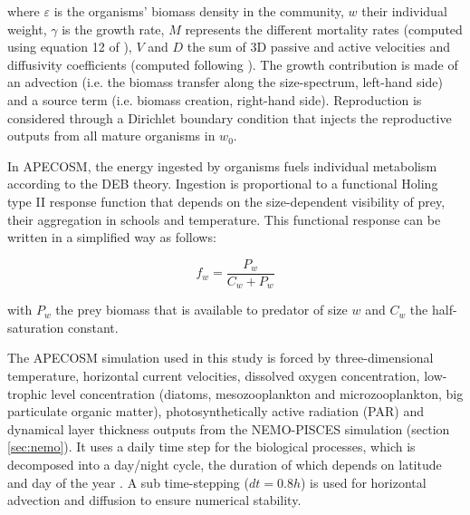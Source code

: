 where $\varepsilon$  is the organisms' biomass density in the community, $w$ their individual weight, $\gamma$ is the growth rate, $M$ represents the different mortality rates (computed using equation 12 of \citealt{mauryIndividualsPopulationsCommunities2013}), $V$ and $D$ the sum of 3D passive and active velocities and diffusivity coefficients (computed following \citealt{faugerasAdvectiondiffusionreactionSizestructuredFish2005}). The growth contribution is made of an advection (i.e. the biomass transfer along the size-spectrum, left-hand side) and a source term (i.e. biomass creation, right-hand side). Reproduction is considered through a Dirichlet boundary condition that injects the reproductive outputs from all mature organisms in $w_0$.

In APECOSM, the energy ingested by organisms fuels individual metabolism according to the DEB theory. Ingestion is proportional to a functional Holing type II response function that depends on the size-dependent visibility of prey, their aggregation in schools and temperature. This functional response can be written in a simplified way as follows:

\begin{equation}
f_{w} = \frac{P_{w}}{C_{w} + P_{w}}
\label{eq:repfonct}
\end{equation}

with $P_{w}$ the prey biomass that is available to predator of size $w$ and $C_{w}$ the half-saturation constant.



The APECOSM simulation used in this study is forced by three-dimensional temperature, horizontal current velocities, dissolved oxygen concentration, low-trophic level concentration (diatoms, mesozooplankton and microzooplankton, big particulate organic matter), photosynthetically active radiation (PAR) and dynamical layer thickness outputs from the NEMO-PISCES simulation (section \ref{sec:nemo}). It uses a daily time step for the biological processes, which is decomposed into a day/night cycle, the duration of which  depends on latitude and day of the year \citep{forsytheModelComparisonDaylength1995}. A sub time-stepping ($dt =0.8h$) is used for horizontal advection and diffusion to ensure numerical stability.

